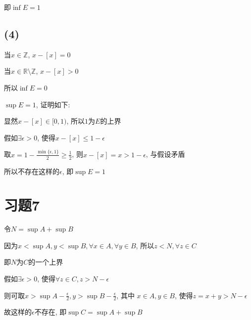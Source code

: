 \documentclass[a4paper,11pt]{article}
\begin{document}
即$\inf E = 1$
\subsection*{(4)}
当$x \in \mathbb{Z}$, $x-[x]=0$

当$x \in \mathbb{R} \setminus \mathbb{Z}$, $x-[x]>0$

所以$\inf E=0$

$\sup E=1$, 证明如下:

显然$x-[x] \in \lbrack0,1)$, 所以$1$为$E$的上界

假如$\exists \epsilon > 0$, 使得$x-[x] \le 1 - \epsilon$

取$x = 1 - \frac{\min\{\epsilon,1\}}{2} \ge \frac{1}{2}$, 则$x-[x]=x > 1 - \epsilon$, 与假设矛盾

所以不存在这样的$\epsilon$, 即$\sup E=1$
\section{习题7}
令$N = \sup A + \sup B$

因为$x<\sup A, y<\sup B, \forall x\in A, \forall y\in B$, 所以$z < N, \forall z \in C$

即$N$为$C$的一个上界

假如$\exists \epsilon > 0$, 使得$\forall z \in C, z > N - \epsilon$

则可取$x > \sup A - \frac{\epsilon}{2}, y > \sup B - \frac{\epsilon}{2}$, 其中 $x\in A, y\in B$, 使得$z = x + y > N - \epsilon$

故这样的$\epsilon$不存在, 即$\sup C = \sup A + \sup B$
\end{document}
